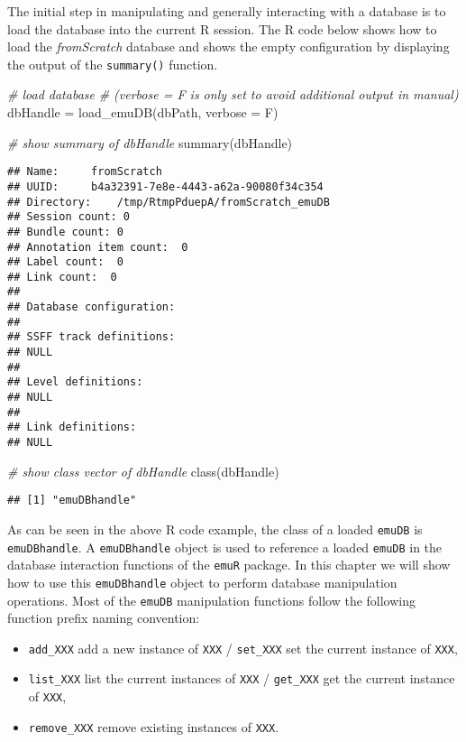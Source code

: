 \documentclass[
]{book}
\newenvironment{Shaded}{\begin{snugshade}}{\end{snugshade}}
\newcommand{\AttributeTok}[1]{\textcolor[rgb]{0.77,0.63,0.00}{#1}}
\newcommand{\CommentTok}[1]{\textcolor[rgb]{0.56,0.35,0.01}{\textit{#1}}}
\newcommand{\FunctionTok}[1]{\textcolor[rgb]{0.00,0.00,0.00}{#1}}
\newcommand{\NormalTok}[1]{#1}
\newcommand{\OtherTok}[1]{\textcolor[rgb]{0.56,0.35,0.01}{#1}}
\providecommand{\tightlist}{%
  \setlength{\itemsep}{0pt}\setlength{\parskip}{0pt}}
\begin{document}
The initial step in manipulating and generally interacting with a database is to load the database into the current R session. The R code below shows how to load the \emph{fromScratch} database and shows the empty configuration by displaying the output of the \texttt{summary()} function.

\begin{Shaded}
\begin{Highlighting}[]
\CommentTok{\# load database}
\CommentTok{\# (verbose = F is only set to avoid additional output in manual)}
\NormalTok{dbHandle }\OtherTok{=} \FunctionTok{load\_emuDB}\NormalTok{(dbPath, }\AttributeTok{verbose =}\NormalTok{ F)}

\CommentTok{\# show summary of dbHandle}
\FunctionTok{summary}\NormalTok{(dbHandle)}
\end{Highlighting}
\end{Shaded}

\begin{verbatim}
## Name:     fromScratch 
## UUID:     b4a32391-7e8e-4443-a62a-90080f34c354 
## Directory:    /tmp/RtmpPduepA/fromScratch_emuDB 
## Session count: 0 
## Bundle count: 0 
## Annotation item count:  0 
## Label count:  0 
## Link count:  0 
## 
## Database configuration:
## 
## SSFF track definitions:
## NULL
## 
## Level definitions:
## NULL
## 
## Link definitions:
## NULL
\end{verbatim}

\begin{Shaded}
\begin{Highlighting}[]
\CommentTok{\# show class vector of dbHandle}
\FunctionTok{class}\NormalTok{(dbHandle)}
\end{Highlighting}
\end{Shaded}

\begin{verbatim}
## [1] "emuDBhandle"
\end{verbatim}

As can be seen in the above R code example, the class of a loaded \texttt{emuDB} is \texttt{emuDBhandle}. A \texttt{emuDBhandle} object is used to reference a loaded \texttt{emuDB} in the database interaction functions of the \texttt{emuR} package. In this chapter we will show how to use this \texttt{emuDBhandle} object to perform database manipulation operations. Most of the \texttt{emuDB} manipulation functions follow the following function prefix naming convention:

\begin{itemize}
\tightlist
\item
  \texttt{add\_XXX} add a new instance of \texttt{XXX} / \texttt{set\_XXX} set the current instance of \texttt{XXX},
\item
  \texttt{list\_XXX} list the current instances of \texttt{XXX} / \texttt{get\_XXX} get the current instance of \texttt{XXX},
\item
  \texttt{remove\_XXX} remove existing instances of \texttt{XXX}.
\end{itemize}
\end{document}
